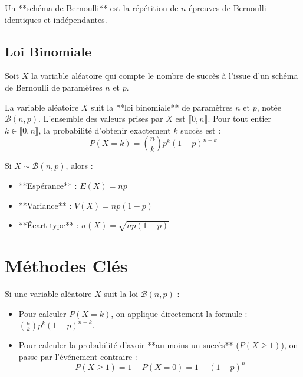\begin{definition}
Un **schéma de Bernoulli** est la répétition de $n$ épreuves de Bernoulli identiques et indépendantes.
\end{definition}

\subsection{Loi Binomiale}

Soit $X$ la variable aléatoire qui compte le nombre de succès à l'issue d'un schéma de Bernoulli de paramètres $n$ et $p$.

\begin{theoreme}
La variable aléatoire $X$ suit la **loi binomiale** de paramètres $n$ et $p$, notée $\mathcal{B}(n, p)$.
L'ensemble des valeurs prises par $X$ est $\llbracket 0, n \rrbracket$.
Pour tout entier $k \in \llbracket 0, n \rrbracket$, la probabilité d'obtenir exactement $k$ succès est :
\[
P(X = k) = \binom{n}{k} p^k (1-p)^{n-k}
\]
\end{theoreme}

\begin{propriete}
Si $X \sim \mathcal{B}(n, p)$, alors :
\begin{itemize}
    \item **Espérance** : $E(X) = np$
    \item **Variance** : $V(X) = np(1-p)$
    \item **Écart-type** : $\sigma(X) = \sqrt{np(1-p)}$
\end{itemize}
\end{propriete}

\section{Méthodes Clés}

\begin{methode}
Si une variable aléatoire $X$ suit la loi $\mathcal{B}(n, p)$ :
\begin{itemize}
    \item Pour calculer $P(X = k)$, on applique directement la formule : $\binom{n}{k} p^k (1-p)^{n-k}$.
    \item Pour calculer la probabilité d'avoir **au moins un succès** ($P(X \ge 1)$), on passe par l'événement contraire :
    \[
    P(X \ge 1) = 1 - P(X = 0) = 1 - (1-p)^n
    \]
\end{itemize}
\end{methode}

